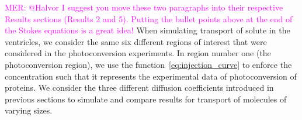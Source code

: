 \documentclass[fleqn]{wlscirep}
\newcommand{\Gs}{\Gamma_{s}}
\newcommand{\Gc}{\Gamma_{c}}
\newcommand{\Gp}{\Gamma_{p}}
\newcommand{\nn}{\mathbf{n}}
\newcommand{\uu}{\mathbf{u}}
\newcommand{\bsig}{\bm{\sigma}}
\newcommand{\bsigpar}{\hat{\bsig}_{\parallel}}
\newcommand{\btau}{\bm{\tau}}
\newcommand{\mer}[1]{\textcolor{magenta}{#1}}
\begin{document}

\mer{MER: @Halvor I suggest you move these two paragraphs into their respective Results sections (Results 2 and 5). Putting the bullet points above at the end of the Stokes equations is a great idea!}
When simulating transport of solute in the ventricles, we consider the same six different regions of interest that were considered in the photoconversion experiments. In region number one (the photoconversion region), we use the function~\eqref{eq:injection_curve} to enforce the concentration such that it represents the experimental data of photoconversion of proteins. We consider the three different diffusion coefficients introduced in previous sections to simulate and compare results for transport of molecules of varying sizes.
\end{document}
